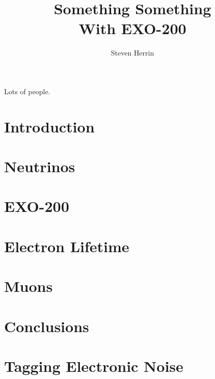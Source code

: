 \documentclass[12pt,twoside]{report}
\begin{document}
\title{Something Something\\
         With EXO-200}
\author{Steven Herrin}
 
\beforepreface



Lots of people.

\afterpreface
 
\chapter{Introduction}


\chapter{Neutrinos}
\label{ch:neutrinos}


\chapter{EXO-200}
\label{ch:detector}

\chapter{Electron Lifetime}
\label{ch:electronlifetime}


\chapter{Muons}
\label{ch:muons}


\chapter{Conclusions}


\appendix
\chapter{Tagging Electronic Noise}
\label{app:noisetagger}






\onlinesignature
\end{document}
